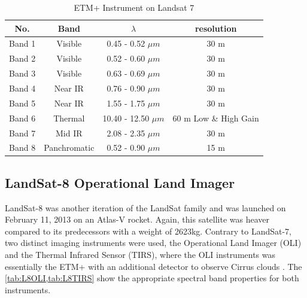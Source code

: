\begin{table}[h!]
	\centering
	\begin{tabular}{ | c | c | c | c |}
	\hline
	\textbf{No.} & \textbf{Band} & \textbf{$\lambda$} & \textbf{resolution} \\
	\hline
	Band 1 & Visible & 0.45 - 0.52 $\mu m$ & {30 m} \\
	Band 2 & Visible & 0.52 - 0.60 $\mu m$ & {30 m} \\
	Band 3 & Visible & 0.63 - 0.69 $\mu m$ & {30 m} \\
	Band 4 & Near IR & 0.76 - 0.90 $\mu m$ & {30 m} \\
	Band 5 & Near IR & 1.55 - 1.75 $\mu m$ & {30 m} \\
	Band 6 & Thermal & 10.40 - 12.50 $\mu m$ & {60 m Low \& High Gain} \\
	Band 7 & Mid IR & 2.08 - 2.35 $\mu m$ & {30 m} \\
	Band 8 & Panchromatic & 0.52 - 0.90 $\mu m$ & {15 m} \\
	\hline
	\end{tabular}
	\caption{ETM+ Instrument on Landsat 7\citep{l7:usgs}}
	\label{tab:L7ETM}
\end{table}


\subsection{LandSat-8 Operational Land Imager}
LandSat-8 was another iteration of the LandSat family and was launched on February 11, 2013 on an Atlas-V rocket. Again, this satellite was heaver compared to its predecessors with a weight of 2623kg. Contrary to LandSat-7, two distinct imaging instruments were used, the Operational Land Imager (OLI) and the Thermal Infrared Sensor (TIRS), where the OLI instruments was essentially the ETM+ with an additional detector to observe Cirrus clouds \citep{l7:usgs}. The \cref{tab:L8OLI,tab:L8TIRS} show the appropriate spectral band properties for both instruments.


